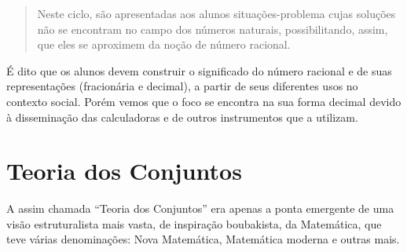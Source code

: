 \begin{quote}
Neste ciclo, são apresentadas aos alunos situações-problema cujas soluções não se encontram no campo dos números naturais, possibilitando, assim, que eles se aproximem da noção de número racional. \cite{brasil2008pde}
\end{quote}

É dito que os alunos devem construir o significado do número racional e de suas representações (fracionária e decimal), a partir de seus diferentes usos no contexto social. Porém vemos que o foco se encontra na sua forma decimal devido à disseminação das calculadoras e de outros instrumentos
que a utilizam.

\section{Teoria dos Conjuntos}

A assim chamada ``Teoria dos Conjuntos'' era apenas a ponta emergente de uma visão estruturalista mais vasta, de inspiração boubakista, da Matemática, que teve várias denominações: Nova Matemática, Matemática moderna e outras mais.\cite{d2007elementos}